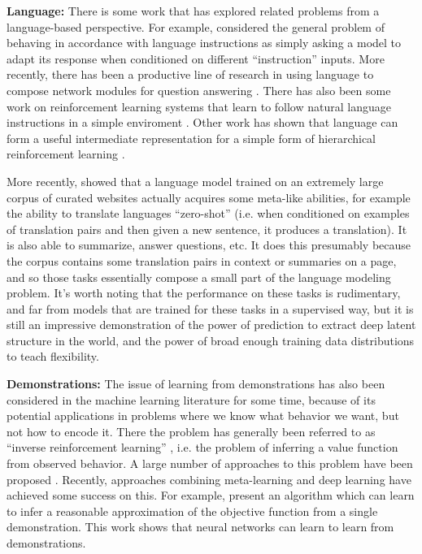 \textbf{Language:} There is some work that has explored related problems from a language-based perspective. For example, \citet{Larochelle2008} considered the general problem of behaving in accordance with language instructions as simply asking a model to adapt its response when conditioned on different ``instruction'' inputs. More recently, there has been a productive line of research in using language to compose network modules for question answering \citep{Andreas, Andreasa}. There has also been some work on reinforcement learning systems that learn to follow natural language instructions in a simple enviroment \citep{Hermann2017}. Other work has shown that language can form a useful intermediate representation for a simple form of hierarchical reinforcement learning \citep{Jiang2019}. \par
More recently, \citet{Radford2019} showed that a language model trained on an extremely large corpus of curated websites actually acquires some meta-like abilities, for example the ability to translate languages ``zero-shot'' (i.e. when conditioned on examples of translation pairs and then given a new sentence, it produces a translation). It is also able to summarize, answer questions, etc. It does this presumably because the corpus contains some translation pairs in context or summaries on a page, and so those tasks essentially compose a small part of the language modeling problem. It's worth noting that the performance on these tasks is rudimentary, and far from models that are trained for these tasks in a supervised way, but it is still an impressive demonstration of the power of prediction to extract deep latent structure in the world, and the power of broad enough training data distributions to teach flexibility. \par  
\textbf{Demonstrations:} The issue of learning from demonstrations has also been considered in the machine learning literature for some time, because of its potential applications in problems where we know what behavior we want, but not how to encode it. There the problem has generally been referred to as ``inverse reinforcement learning'' \citep{Ng2000}, i.e. the problem of inferring a value function from observed behavior. A large number of approaches to this problem have been proposed \citep[e.g.][]{Ng2000, Abbeel2004}. Recently, approaches combining meta-learning and deep learning have achieved some success on this. For example, \citet{Finn2016} present an algorithm which can learn to infer a reasonable approximation of the objective function from a single demonstration. This work shows that neural networks can learn to learn from demonstrations. \par
